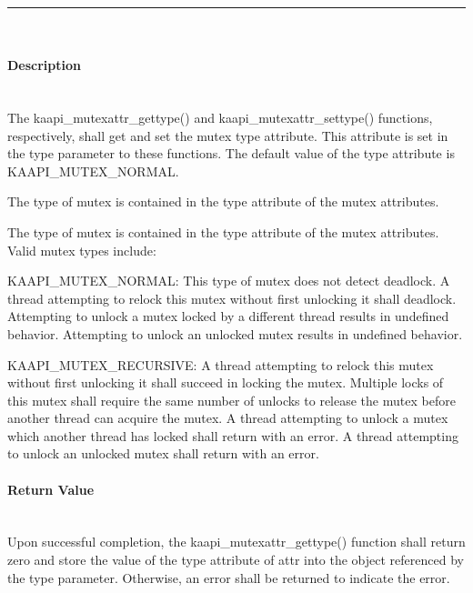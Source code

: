 
\begin{description}
\vspace*{3ex} \hrule width 4cm
\vspace*{3ex} 
\item [\texttt{int kaapi\_mutexattr\_gettype (const kaapi\_mutexattr\_t
    *\_\_restrict, int *\_\_restrict);}]
\item [\texttt{int kaapi\_mutexattr\_settype (kaapi\_mutexattr\_t *, int);}]~\\

\paragraph{Description}~\\
The kaapi\_mutexattr\_gettype() and kaapi\_mutexattr\_settype() functions,
respectively, shall get and set the mutex type attribute. This attribute is
set in the type parameter to these functions. The default value of the type
attribute is KAAPI\_MUTEX\_NORMAL.

The type of mutex is contained in the type attribute of the mutex attributes.

The type of mutex is contained in the type attribute of the mutex
attributes. Valid mutex types include:

KAAPI\_MUTEX\_NORMAL: This type of mutex does not detect deadlock. A thread
attempting to relock this mutex without first unlocking it shall
deadlock. Attempting to unlock a mutex locked by a different thread results in
undefined behavior. Attempting to unlock an unlocked mutex results in
undefined behavior.

KAAPI\_MUTEX\_RECURSIVE: A thread attempting to relock this mutex without
first unlocking it shall succeed in locking the mutex. Multiple locks of this
mutex shall require the same number of unlocks to release the mutex before
another thread can acquire the mutex. A thread attempting to unlock a mutex
which another thread has locked shall return with an error. A thread
attempting to unlock an unlocked mutex shall return with an error.

\paragraph{Return Value}~\\
Upon successful completion, the kaapi\_mutexattr\_gettype() function shall
return zero and store the value of the type attribute of attr into the object
referenced by the type parameter. Otherwise, an error shall be returned to
indicate the error.


\end{description}
